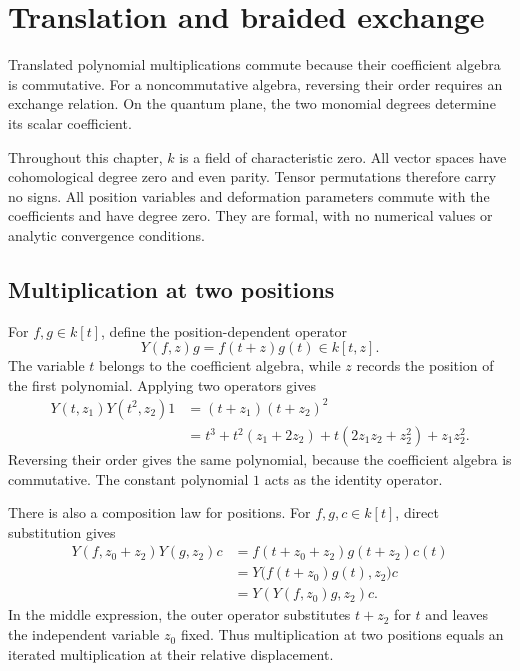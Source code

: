 \chapter{Translation and braided exchange}
\label{chap:translation-braided-exchange}

Translated polynomial multiplications commute because their coefficient
algebra is commutative.
For a noncommutative algebra, reversing their order requires an exchange relation.
On the quantum plane, the two monomial degrees determine its scalar coefficient.

Throughout this chapter, $k$ is a field of characteristic zero.
All vector spaces have cohomological degree zero and even parity.
Tensor permutations therefore carry no signs.
All position variables and deformation parameters commute with the
coefficients and have degree zero.
They are formal, with no numerical values or analytic convergence conditions.

\section{Multiplication at two positions}
\label{sec:vertex-polynomial-translation}

For $f,g\in k[t]$, define the position-dependent operator
\[
 Y(f,z)g=f(t+z)g(t)\in k[t,z].
\]
The variable $t$ belongs to the coefficient algebra, while $z$
records the position of the first polynomial.
Applying two operators gives
\[
 \begin{aligned}
 Y(t,z_1)Y(t^2,z_2)1
   &=(t+z_1)(t+z_2)^2\\
   &=t^3+t^2(z_1+2z_2)+t(2z_1z_2+z_2^2)+z_1z_2^2.
 \end{aligned}
\]
Reversing their order gives the same polynomial, because the
coefficient algebra is commutative.
The constant polynomial $1$ acts as the identity operator.

There is also a composition law for positions.
For $f,g,c\in k[t]$, direct substitution gives
\[
 \begin{aligned}
 Y(f,z_0+z_2)Y(g,z_2)c
   &=f(t+z_0+z_2)g(t+z_2)c(t)\\
   &=Y\bigl(f(t+z_0)g(t),z_2\bigr)c\\
   &=Y(Y(f,z_0)g,z_2)c.
 \end{aligned}
\]
In the middle expression, the outer operator substitutes $t+z_2$
for $t$ and leaves the independent variable $z_0$ fixed.
Thus multiplication at two positions equals an iterated multiplication
at their relative displacement.

